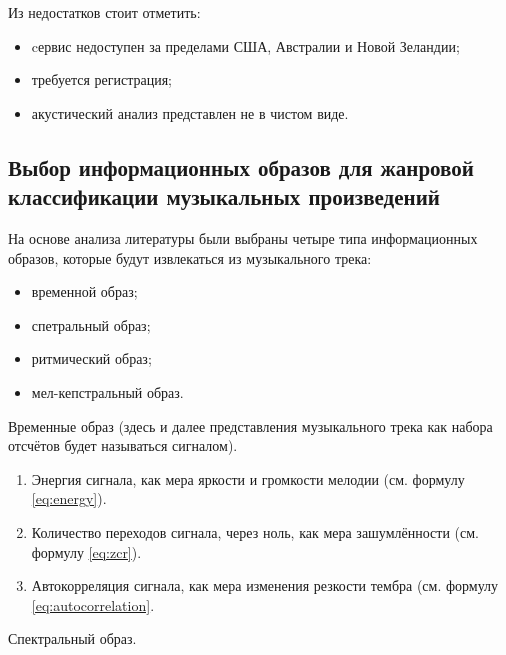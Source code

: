 Из недостатков стоит отметить:
\begin{itemize}
\item cервис недоступен за пределами США, Австралии и Новой Зеландии;
\item требуется регистрация;
\item акустический анализ представлен не в чистом виде.
\end{itemize}



\subsection{Выбор информационных образов для жанровой классификации музыкальных произведений}
\label{sub:domain:feature_selection}
На основе анализа литературы были выбраны четыре типа информационных образов, которые будут извлекаться из музыкального трека:
\begin{itemize}
\item временной образ;
\item спетральный образ;
\item ритмический образ;
\item мел-кепстральный образ.
\end{itemize}

Временные образ (здесь и далее представления музыкального трека как набора отсчётов будет называться сигналом).

\begin{enumerate}[label=\arabic*.]
\item Энергия сигнала, как мера яркости и громкости мелодии (см. формулу \ref{eq:energy}).
\item Количество переходов сигнала, через ноль, как мера зашумлённости (см. формулу \ref{eq:zcr}).
\item Автокорреляция сигнала, как мера изменения резкости тембра (см. формулу \ref{eq:autocorrelation}.
\end{enumerate}

Спектральный образ.

